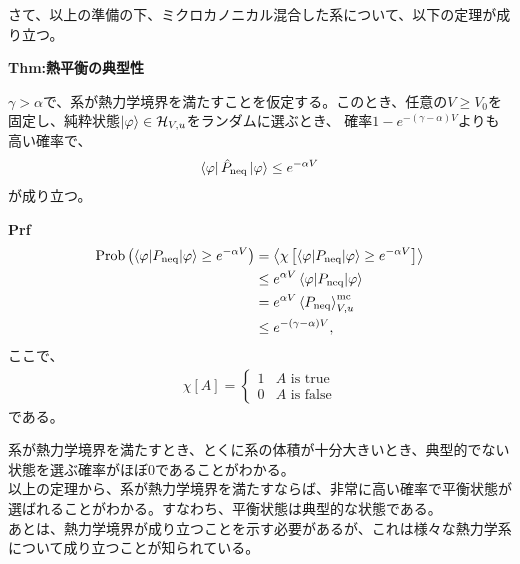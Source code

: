 \documentclass[a4paper,11pt]{jsarticle}
\numberwithin{equation}{section}
\begin{document}
さて、以上の準備の下、ミクロカノニカル混合した系について、以下の定理が成り立つ。\\
\begin{itembox}[l]{\textbf{Thm:熱平衡の典型性}}
  
  $\gamma > \alpha$で、系が熱力学境界を満たすことを仮定する。このとき、任意の$V \geq V_0$を固定し、純粋状態$\ket{\varphi} \in \mathcal{H}_{V,u}$をランダムに選ぶとき、
  確率$1-e^{-(\gamma - \alpha)V}$よりも高い確率で、
  \begin{align}
    \bra{\varphi}\hat{P}_{\text{neq}}\ket{\varphi} \leq e^{-\alpha V}
  \end{align}
  が成り立つ。
\end{itembox}
\textbf{Prf}\\
\begin{align}
  \text{Prob} \left( \left\langle \varphi \middle| P_{\text{neq}} \middle| \varphi \right\rangle \geq e^{-\alpha V} \right) &= \left\langle \chi \left[ \left\langle \varphi \middle| P_{\text{neq}} \middle| \varphi \right\rangle \geq e^{-\alpha V} \right] \right\rangle \\
  &\leq e^{\alpha V} \left\langle \varphi \middle| P_{\text{neq}} \middle| \varphi \right\rangle  \\
  &= e^{\alpha V} \ev{P_{\text{neq}}}_{V,u}^{\text{mc}} \\
  &\leq e^{-(\gamma - \alpha)V},
  \end{align}
  ここで、
  \begin{align}
    \chi[A] = \begin{cases}
      1 & A \text{ is true} \\
      0 & A \text{ is false}
    \end{cases}
  \end{align}
  である。
  

系が熱力学境界を満たすとき、とくに系の体積が十分大きいとき、典型的でない状態を選ぶ確率がほぼ0であることがわかる。\\

以上の定理から、系が熱力学境界を満たすならば、非常に高い確率で平衡状態が選ばれることがわかる。すなわち、平衡状態は典型的な状態である。\\

あとは、熱力学境界が成り立つことを示す必要があるが、これは様々な熱力学系について成り立つことが知られている。\\
\end{document}
